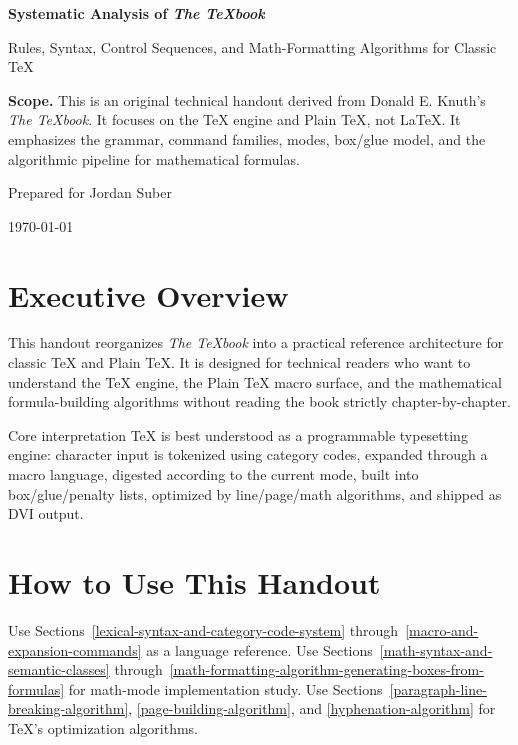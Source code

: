\documentclass[11pt]{article}
\begin{document}

\begin{titlepage}
  \centering
  \vspace*{0.7in}
  {\Huge\bfseries\color{Navy} Systematic Analysis of \emph{The TeXbook}\par}
  \vspace{0.35in}
  {\Large Rules, Syntax, Control Sequences, and Math-Formatting Algorithms for Classic TeX\par}
  \vspace{0.45in}
  \begin{tcolorbox}[colback=SoftBlue,colframe=Navy,width=0.84\textwidth,arc=2mm,boxrule=0.6pt]
  \textbf{Scope.} This is an original technical handout derived from Donald E. Knuth's \emph{The TeXbook}. It focuses on the TeX engine and Plain TeX, not LaTeX. It emphasizes the grammar, command families, modes, box/glue model, and the algorithmic pipeline for mathematical formulas.
  \end{tcolorbox}
  \vfill
  {\large Prepared for Jordan Suber\par}
  \vspace{0.1in}
  {\large \today\par}
\end{titlepage}

\clearpage
{}
\tableofcontents
\newpage
{}


\section*{Executive Overview}
This handout reorganizes \emph{The TeXbook} into a practical reference architecture for classic TeX and Plain TeX. It is designed for technical readers who want to understand the TeX engine, the Plain TeX macro surface, and the mathematical formula-building algorithms without reading the book strictly chapter-by-chapter.

\begin{insightbox}{Core interpretation}
TeX is best understood as a programmable typesetting engine: character input is tokenized using category codes, expanded through a macro language, digested according to the current mode, built into box/glue/penalty lists, optimized by line/page/math algorithms, and shipped as DVI output.
\end{insightbox}

\section*{How to Use This Handout}
Use Sections~\ref{lexical-syntax-and-category-code-system} through~\ref{macro-and-expansion-commands} as a language reference. Use Sections~\ref{math-syntax-and-semantic-classes} through~\ref{math-formatting-algorithm-generating-boxes-from-formulas} for math-mode implementation study. Use Sections~\ref{paragraph-line-breaking-algorithm}, \ref{page-building-algorithm}, and \ref{hyphenation-algorithm} for TeX's optimization algorithms.
\end{document}
